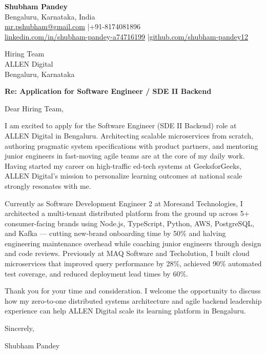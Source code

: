 \documentclass[a4paper,11pt]{article}
\begin{document}
\textbf{Shubham Pandey} \\
Bengaluru, Karnataka, India \\
\href{mailto:mr.pshubham@gmail.com}{mr.pshubham@gmail.com} \quad|\quad +91-8174081896 \\
\href{https://www.linkedin.com/in/shubham-pandey-a74716199/}{linkedin.com/in/shubham-pandey-a74716199} \quad|\quad \href{https://github.com/shubham-pandey12}{github.com/shubham-pandey12}

\vspace{1em}

Hiring Team \\
ALLEN Digital \\
Bengaluru, Karnataka

\vspace{1em}

\textbf{Re: Application for Software Engineer / SDE II Backend}

Dear Hiring Team,

I am excited to apply for the Software Engineer (SDE II Backend) role at ALLEN Digital in Bengaluru. Architecting scalable microservices from scratch, authoring pragmatic system specifications with product partners, and mentoring junior engineers in fast-moving agile teams are at the core of my daily work. Having started my career on high-traffic ed-tech systems at GeeksforGeeks, ALLEN Digital's mission to personalize learning outcomes at national scale strongly resonates with me.

Currently as Software Development Engineer 2 at Moresand Technologies, I architected a multi-tenant distributed platform from the ground up across 5+ consumer-facing brands using Node.js, TypeScript, Python, AWS, PostgreSQL, and Kafka — cutting new-brand onboarding time by 50\% and halving engineering maintenance overhead while coaching junior engineers through design and code reviews. Previously at MAQ Software and Techolution, I built cloud microservices that improved query performance by 28\%, achieved 90\% automated test coverage, and reduced deployment lead times by 60\%.

Thank you for your time and consideration. I welcome the opportunity to discuss how my zero-to-one distributed systems architecture and agile backend leadership experience can help ALLEN Digital scale its learning platform in Bengaluru.

\vspace{1em}

Sincerely,

Shubham Pandey
\end{document}
